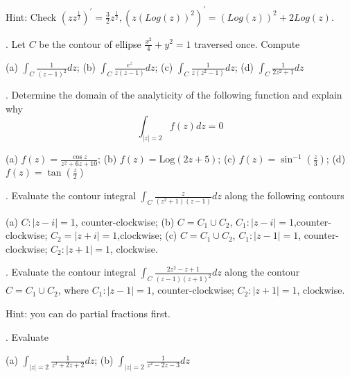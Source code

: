 Hint: Check $ (z z^{\frac{1}{2}})^{'} = \frac{3}{2} z^{\frac{1}{2}},  ( z (Log (z))^2)^{'} = (Log (z))^2 + 2 Log (z)$.


\medskip

. Let $C$ be the contour of ellipse $ \frac{x^2}{4}+ y^2=1$ traversed once. Compute

(a) $ \int_C \frac{ 1 }{ (z-1)^2 } dz$; (b) $ \int_C \frac{ e^z }{ z (z-1) } dz$; (c) $ \int_C \frac{ 1 }{ z (z^2-1) } dz$; (d) $ \int_{C} \frac{1}{ 2z^2+1} dz $

\medskip

. Determine the domain of the analyticity of the following function and explain why
$$ \int_{|z|=2} f(z) dz=0 $$

(a) $f(z)=\frac{\cos z}{ z^2+6z+10}$; (b) $ f(z) = \mbox{Log} (2z+5)$; (c) $ f(z)= \sin^{-1} (\frac{z}{3})$; (d) $ f(z)= \tan (\frac{z}{2}) $

\medskip





. Evaluate the contour integral $\int_{C} \frac{z}{ (z^2+1)(z-1)} dz$ along the following contours

(a) $C: | z-i|=1$, counter-clockwise; (b) $C= C_1 \cup C_2$, $C_1: |z-i|=1$,counter-clockwise; $C_2= |z+i|=1$,clockwise;  (c) $C= C_1 \cup C_2 $, $C_1: |z-1|=1$, counter-clockwise; $C_2:  |z+1|=1$, clockwise.



\medskip


. Evaluate the contour integral $ \int_{C} \frac{2z^2-z+1}{ (z-1)(z+1)^2} dz $ along the contour $C= C_1 \cup C_2 $, where $C_1: |z-1|=1$, counter-clockwise; $C_2:  |z+1|=1$, clockwise.


Hint: you can do partial fractions first.
\medskip


. Evaluate

(a) $\int_{|z|=2} \frac{1}{ z^2 +2z +2} dz$; (b) $ \int_{|z|=2} \frac{ 1}{ z^2 -2z-3} dz $











